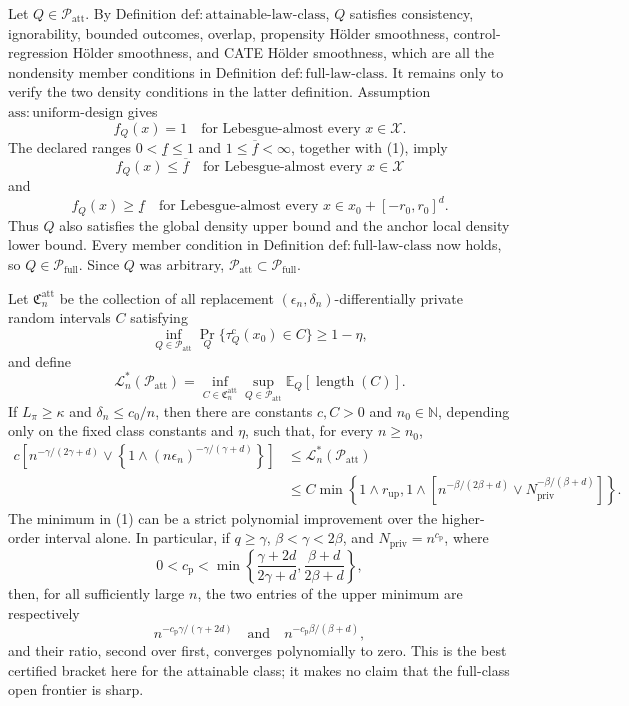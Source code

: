 Let \(Q\in\mathcal P_{\mathrm{att}}\).  By Definition
\(\mathrm{def{:}attainable\text{-}law\text{-}class}\), \(Q\) satisfies
consistency, ignorability, bounded outcomes, overlap, propensity H\"older
smoothness, control-regression H\"older smoothness, and CATE H\"older
smoothness, which are all the nondensity member conditions in Definition
\(\mathrm{def{:}full\text{-}law\text{-}class}\).  It remains only to verify
the two density conditions in the latter definition.  Assumption
\(\mathrm{ass{:}uniform\text{-}design}\) gives
\[
 f_Q(x)=1
 \quad\text{for Lebesgue-almost every }x\in\mathcal X.
\tag{1}
\]
The declared ranges \(0<\underline f\le1\) and
\(1\le\overline f<\infty\), together with (1), imply
\[
 f_Q(x)\le\overline f
 \quad\text{for Lebesgue-almost every }x\in\mathcal X
\tag{2}
\]
and
\[
 f_Q(x)\ge\underline f
 \quad\text{for Lebesgue-almost every }
 x\in x_0+[-r_0,r_0]^d.
\tag{3}
\]
Thus \(Q\) also satisfies the global density upper bound and the anchor
local density lower bound.  Every member condition in Definition
\(\mathrm{def{:}full\text{-}law\text{-}class}\) now holds, so
\(Q\in\mathcal P_{\mathrm{full}}\).  Since \(Q\) was arbitrary,
\(\mathcal P_{\mathrm{att}}\subset\mathcal P_{\mathrm{full}}\).

Let \(\mathfrak C_n^{\mathrm{att}}\) be the collection of all replacement
\((\epsilon_n,\delta_n)\)-differentially private random intervals \(C\)
satisfying
\[
 \inf_{Q\in\mathcal P_{\mathrm{att}}}
 \Pr_Q\{\tau_Q^{\mathrm c}(x_0)\in C\}\ge1-\eta,
\]
and define
\[
 \mathcal L_n^*(\mathcal P_{\mathrm{att}})
 =\inf_{C\in\mathfrak C_n^{\mathrm{att}}}
   \sup_{Q\in\mathcal P_{\mathrm{att}}}
   \mathbb E_Q[\operatorname{length}(C)].
\]
If \(L_\pi\ge\kappa\) and \(\delta_n\le c_0/n\), then there are
constants \(c,C>0\) and \(n_0\in\mathbb N\), depending only on the fixed
class constants and \(\eta\), such that, for every \(n\ge n_0\),
\[
 \begin{aligned}
 c\left[n^{-\gamma/(2\gamma+d)}
 \vee\left\{1\wedge(n\epsilon_n)^{-\gamma/(\gamma+d)}\right\}\right]
 &\le \mathcal L_n^*(\mathcal P_{\mathrm{att}})\\
 &\le C\min\left\{
 1\wedge r_{\mathrm{up}},
 1\wedge\left[n^{-\beta/(2\beta+d)}
       \vee N_{\mathrm{priv}}^{-\beta/(\beta+d)}\right]
 \right\}.
 \end{aligned}
\tag{1}
\]
The minimum in (1) can be a strict polynomial improvement over the
higher-order interval alone.  In particular, if \(q\ge\gamma\),
\(\beta<\gamma<2\beta\), and
\(N_{\mathrm{priv}}=n^{c_{\mathrm p}}\), where
\[
 0<c_{\mathrm p}<
 \min\left\{\frac{\gamma+2d}{2\gamma+d},
             \frac{\beta+d}{2\beta+d}\right\},
\tag{2}
\]
then, for all sufficiently large \(n\), the two entries of the upper
minimum are respectively
\[
 n^{-c_{\mathrm p}\gamma/(\gamma+2d)}
 \quad\text{and}\quad
 n^{-c_{\mathrm p}\beta/(\beta+d)},
\]
and their ratio, second over first, converges polynomially to zero.  This
is the best certified bracket here for the attainable class; it makes no
claim that the full-class open frontier is sharp.

